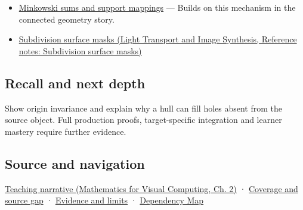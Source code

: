 \hypertarget{appendix-0026ec42c9d5-used-by}{}

\begin{itemize}
\tightlist
\item
  \hyperref[appendix-215ac7099a82]{Minkowski sums and support mappings} --- Builds on this mechanism in the connected geometry story.
\item
  \href{../04-Light-Transport-and-Image-Synthesis/main.pdf\#nameddest=appendix-0234ab7f86b1}{Subdivision surface masks (Light Transport and Image Synthesis, Reference notes: Subdivision surface masks)}
\end{itemize}

\subsection{Recall and next depth}\label{appendix-0026ec42c9d5-recall-and-next-depth}

\hypertarget{appendix-0026ec42c9d5-recall-and-next-depth}{}

Show origin invariance and explain why a hull can fill holes absent from the source object. Full production proofs, target-specific integration and learner mastery require further evidence.

\subsection{Source and navigation}\label{appendix-0026ec42c9d5-source-and-navigation}

\hypertarget{appendix-0026ec42c9d5-source-and-navigation}{}

\href{../02-Mathematics-for-Visual-Computing/main.pdf\#nameddest=01-foundations-i-ch018-weighted-points-lead-from-affine-geometry-to-collision-shapes}{Teaching narrative (Mathematics for Visual Computing, Ch. 2)} · \hyperref[appendix-fd090d982a15-phase-6---parts-501-600]{Coverage and source gap} · \hyperref[appendix-a103e7846d21-phase-6---source-analysis-and-verification]{Evidence and limits} · \hyperref[appendix-4ad47bdd269a]{Dependency Map}
